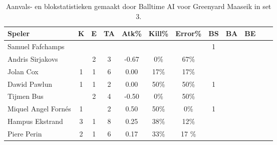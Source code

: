 \begin{table}[ht!]
  \centering
  \scriptsize
  \begin{tabular}{|l|c|c|c|c|c|c|c|c|c|c|c|} \hline
    \textbf{Speler} &  K & E & TA & Atk\% & Kill\% & Error\% & BS & BA & BE \\ \hline
    Samuel Fafchamps &   &   &   &   &   &   & 1 &  & \\
    Andris Sirjakovs &  & 2 & 3 & -0.67 & 0\% & 67\% &   &  & \\
    Jolan Cox & 1 & 1 & 6 & 0.00 & 17\% & 17\% &  &  & \\
    Dawid Pawlun & 1 & 1 & 2 & 0.00 & 50\% & 50\% & 1 &  & \\
    Tijmen Bus &  & 2 & 4 & -0.50 & 0\% & 50\% & &  &  \\
    Miquel Angel Fornés & 1 &  & 2 & 0.50 & 50\% & 0\% & 1 & & \\
    Hampus Ekstrand & 3 & 1 & 8 & 0.25 & 38\% & 12\% &   &   &  \\
    Piere Perin & 2 & 1 & 6 & 0.17 & 33\% & 17 \%&  &  & \\ \hline
  \end{tabular}
  \caption[Aanvals- en blokstatistieken gemaakt door Balltime AI voor Greenyard Maaseik in set 3]{\label{tab:PL1AttBlockMaaseikAI3}Aanvals- en blokstatistieken gemaakt door Balltime AI voor Greenyard Maaseik in set 3.}
\end{table}
